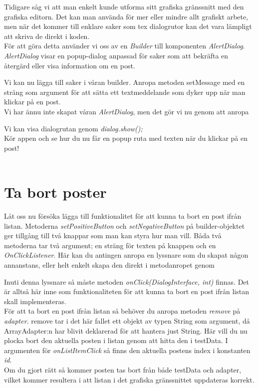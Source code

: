 \documentclass[11 pt, titlepage]{article} %
\begin{document}
Tidigare såg vi att man enkelt kunde utforma sitt grafiska gränssnitt med den grafiska editorn. Det kan man använda för mer eller mindre allt grafiskt arbete, men när det kommer till enklare saker som tex dialogrutor kan det vara lämpligt att skriva de direkt i koden.\\

För att göra detta använder vi oss av en \textit{Builder} till komponenten \textit{AlertDialog}. \textit{AlertDialog} visar en popup-dialog anpassad för saker som att bekräfta en återgärd eller visa information om en post.


Vi kan nu lägga till saker i våran builder. Anropa metoden setMessage med en sträng som argument för att sätta ett textmeddelande som dyker upp när man klickar på en post.\\

Vi har ännu inte skapat våran \textit{AlertDialog}, men det gör vi nu genom att anropa 

Vi kan visa dialogrutan genom \textit{dialog.show();}\\

Kör appen och se hur du nu får en popup ruta med texten när du klickar på en post!\\ \\

\section{Ta bort poster}
Låt oss nu försöka lägga till funktionalitet för att kunna ta bort en post ifrån listan. 
Metoderna \textit{setPositiveButton} och \textit{setNegativeButton} på builder-objektet ger tillgång till två knappar som man kan styra hur man vill. Båda två metoderna tar två argument; en sträng för texten på knappen och en \textit{OnClickListener}.
Här kan du antingen anropa en lyssnare som du skapat någon annanstans, eller helt enkelt skapa den direkt i metodanropet genom 


Inuti denna lyssnare så måste metoden \textit{onClick(DialogInterface, int)} finnas. Det är alltså här inne som funktionaliteten för att kunna ta bort en post ifrån listan skall implementeras.\\

För att ta bort en post ifrån listan så behöver du anropa metoden \textit{remove} på \textit{adapter}. remove tar i det här fallet ett objekt av typen String som argument, då ArrayAdapter:n har blivit deklarerad för att hantera just String. Här vill du nu plocka bort den aktuella posten i listan genom att hitta den i testData.
I argumenten för \textit{onListItemClick} så finns den aktuella postens index i konstanten \textit{id}.\\  
Om du gjort rätt så kommer posten tas bort från både testData och adapter, vilket kommer resultera i att listan i det grafiska gränssnittet uppdateras korrekt.\\
\end{document}
